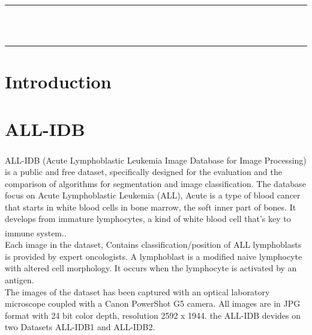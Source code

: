 \vspace*{\fill}
\begin{center}
    {\color{Black} \rule{\linewidth}{1.2mm} }\\
\vspace{0.25in}
    {\centering{}}
\vspace{0.35in}\\
    {\color{Black} \rule{\linewidth}{1.2mm} }
\end{center}
\vspace*{\fill}
\setcounter{section}{0}

\newpage

\section{Introduction}
\hspace*{0.16in}

\section{ALL-IDB}

ALL-IDB (Acute Lymphoblastic Leukemia Image Database for Image Processing) \textsuperscript{\cite{labati2011all}} is a public and free dataset, specifically designed for the evaluation and the comparison of algorithms for segmentation and image classification. The database focus on Acute Lymphoblastic Leukemia (ALL), Acute is a type of blood cancer that starts in white blood cells in bone marrow, the soft inner part of bones. It develops from immature lymphocytes, a kind of white blood cell that’s key to immune system.\textsuperscript{\cite{Annie_Stuart_What_2022_webmd}}.\\

Each image in the dataset, Contains classification/position of ALL lymphoblasts is provided by expert oncologists. A lymphoblast is a modified naive lymphocyte with altered cell morphology. It occurs when the lymphocyte is activated by an antigen.\\

The images of the dataset has been captured with an optical laboratory microscope coupled with a Canon PowerShot G5 camera. All images are in JPG format with 24 bit color depth, resolution 2592 x 1944. the ALL-IDB devides on two Datasets ALL-IDB1 and ALL-IDB2.\\

